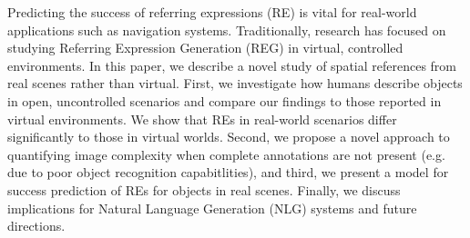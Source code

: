 Predicting the success of referring expressions (RE) is vital for real-world applications such as navigation systems. Traditionally, research has focused on studying Referring Expression Generation (REG) in virtual, controlled environments. In this paper, we describe a novel study of spatial references from real scenes rather than virtual. First, we investigate how humans describe objects in open, uncontrolled scenarios and compare our findings to those reported in virtual environments. We show that REs in real-world scenarios differ significantly to those in virtual worlds. Second, we propose a novel approach to quantifying image complexity when complete annotations are not present (e.g. due to poor object recognition capabitlities), and third, we present a model for success prediction of REs for objects in real scenes. Finally, we discuss implications for Natural Language Generation (NLG) systems and future directions.
